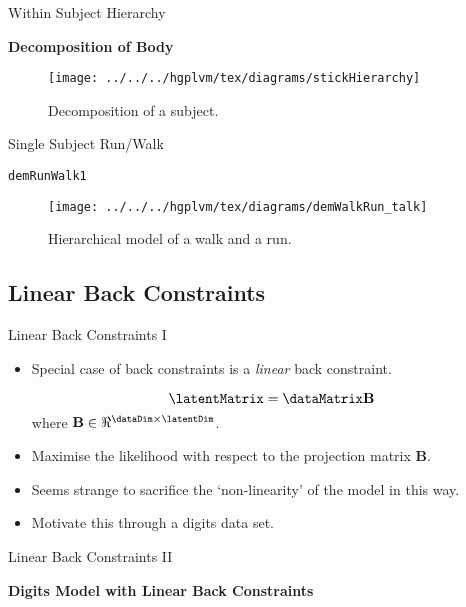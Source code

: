 Within Subject Hierarchy

\textbf{Decomposition of Body}

%
\begin{figure}
\begin{centering}
\texttt{[image: ../../../hgplvm/tex/diagrams/stickHierarchy]}
\par\end{centering}

\caption{Decomposition of a subject.}

\end{figure}


Single Subject Run/Walk

\texttt{demRunWalk1}

\begin{flushright}
%
\begin{figure}
\begin{centering}
\texttt{[image: ../../../hgplvm/tex/diagrams/demWalkRun\_talk]}
\par\end{centering}

\caption{Hierarchical model of a walk and a run.}

\end{figure}

\par\end{flushright}


\subsection{Linear Back Constraints}

Linear Back Constraints I
\begin{itemize}
\item Special case of back constraints is a \emph{linear} back constraint.


\[
\latentMatrix=\dataMatrix\mathbf{B}\]
where $\mathbf{B}\in\Re^{\dataDim\times\latentDim}$.

\item Maximise the likelihood with respect to the projection matrix $\mathbf{B}$.
\item Seems strange to sacrifice the `non-linearity' of the model in this
way.
\item Motivate this through a digits data set.
\end{itemize}
Linear Back Constraints II

\textbf{Digits Model with Linear Back Constraints}

